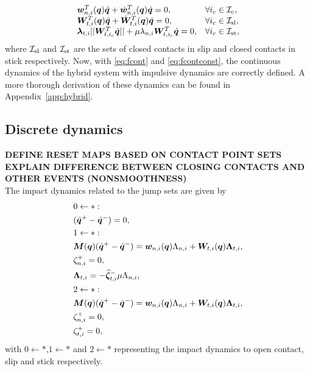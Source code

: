 \documentclass[../DC2017114Bouma.tex]{subfiles}
\begin{document}
\begin{equation}
\begin{array}{ll}
{\boldsymbol{w}}^T_{n,i}({\boldsymbol{q}})\ddot{{\boldsymbol{q}}} + \dot{{\boldsymbol{w}}}^T_{n,i}({\boldsymbol{q}})\dot{{\boldsymbol{q}}} = 0, & \forall i_c\in\mathcal{I}_{\text{c}},\\
{\boldsymbol{W}}^T_{t,i}({\boldsymbol{q}})\ddot{{\boldsymbol{q}}} + \dot{{\boldsymbol{W}}}^T_{t,i}({\boldsymbol{q}})\dot{{\boldsymbol{q}}} = 0, & \forall i_c\in\mathcal{I}_{\text{sl}},\\
\boldsymbol{\lambda}_{t,i}||{\boldsymbol{W}}_{t,i_c}^T\dot{{\boldsymbol{q}}}|| + \mu\lambda_{n,i}{\boldsymbol{W}}_{t,i_c}^T\dot{{\boldsymbol{q}}} = 0, & \forall i_c\in\mathcal{I}_{\text{st}},
\end{array}\label{eq:fcontconst}
\end{equation}
where $\mathcal{I}_{\text{sl}}$ and $\mathcal{I}_{\text{st}}$ are the sets of closed contacts in slip and closed contacts in stick respectively. Now, with \eqref{eq:fcont} and \eqref{eq:fcontconst}, the continuous dynamics of the hybrid system with impulsive dynamics are correctly defined. A more thorough derivation of these dynamics can be found in Appendix~\ref{app:hybrid}.

\subsection{Discrete dynamics}\label{sec:2discdyn}
\textbf{DEFINE RESET MAPS BASED ON CONTACT POINT SETS}\\
\textbf{EXPLAIN DIFFERENCE BETWEEN CLOSING CONTACTS AND OTHER EVENTS (NONSMOOTHNESS)}\\
The impact dynamics related to the jump sets are given by
\begin{align}
&0\leftarrow \ast:\nonumber\\
&(\dot{{\boldsymbol{q}}}^+ - \dot{{\boldsymbol{q}}}^-) = 0,\label{eq:appjump1}\\
&1\leftarrow\ast:\nonumber\\
&{\boldsymbol{M}}({\boldsymbol{q}})(\dot{{\boldsymbol{q}}}^+ - \dot{{\boldsymbol{q}}}^-) = {\boldsymbol{w}}_{n,i}({\boldsymbol{q}})\Lambda_{n,i} + {\boldsymbol{W}}_{t,i}({\boldsymbol{q}})\boldsymbol{\Lambda}_{t,i},\label{eq:appjump2}\\
&\zeta_{n,i}^+=0,\label{eq:appjump3}\\
&\boldsymbol{\Lambda}_{t,i} = -\widehat{\boldsymbol{\zeta}}^-_{t,i}\mu\Lambda_{n,i},\label{eq:appjump4}\\
&2\leftarrow \ast:\nonumber\\
&{\boldsymbol{M}}({\boldsymbol{q}})(\dot{{\boldsymbol{q}}}^+ - \dot{{\boldsymbol{q}}}^-) = {\boldsymbol{w}}_{n,i}({\boldsymbol{q}})\Lambda_{n,i} + {\boldsymbol{W}}_{t,i}({\boldsymbol{q}})\boldsymbol{\Lambda}_{t,i},\label{eq:appjump5}\\
&\zeta_{n,i}^+=0,\label{eq:appjump6}\\
&\zeta_{t,i}^+= 0,\label{eq:appjump7}
\end{align}
with $0\leftarrow\ast$,$1\leftarrow\ast$ and $2\leftarrow\ast$ representing the impact dynamics to open contact, slip and stick respectively. 
\end{document}
